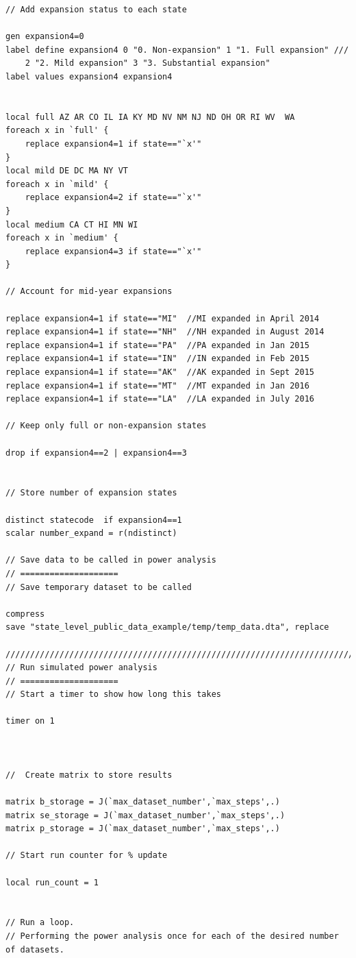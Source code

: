 \documentclass[12pt]{article}%
\begin{document}
\begin{appendices}
\begin{footnotesize}
\begin{verbatim}
// Add expansion status to each state

gen expansion4=0
label define expansion4 0 "0. Non-expansion" 1 "1. Full expansion" ///
    2 "2. Mild expansion" 3 "3. Substantial expansion" 
label values expansion4 expansion4


local full AZ AR CO IL IA KY MD NV NM NJ ND OH OR RI WV  WA
foreach x in `full' {
    replace expansion4=1 if state=="`x'"
}     
local mild DE DC MA NY VT
foreach x in `mild' {
    replace expansion4=2 if state=="`x'"
}
local medium CA CT HI MN WI
foreach x in `medium' {
    replace expansion4=3 if state=="`x'"
}

// Account for mid-year expansions

replace expansion4=1 if state=="MI"  //MI expanded in April 2014
replace expansion4=1 if state=="NH"  //NH expanded in August 2014
replace expansion4=1 if state=="PA"  //PA expanded in Jan 2015
replace expansion4=1 if state=="IN"  //IN expanded in Feb 2015
replace expansion4=1 if state=="AK"  //AK expanded in Sept 2015
replace expansion4=1 if state=="MT"  //MT expanded in Jan 2016
replace expansion4=1 if state=="LA"  //LA expanded in July 2016

// Keep only full or non-expansion states

drop if expansion4==2 | expansion4==3


// Store number of expansion states

distinct statecode  if expansion4==1 
scalar number_expand = r(ndistinct)  

// Save data to be called in power analysis
// ====================
// Save temporary dataset to be called 

compress
save "state_level_public_data_example/temp/temp_data.dta", replace

////////////////////////////////////////////////////////////////////////////////
// Run simulated power analysis
// ====================
// Start a timer to show how long this takes

timer on 1



//  Create matrix to store results

matrix b_storage = J(`max_dataset_number',`max_steps',.) 
matrix se_storage = J(`max_dataset_number',`max_steps',.) 
matrix p_storage = J(`max_dataset_number',`max_steps',.)

// Start run counter for % update

local run_count = 1


// Run a loop. 
// Performing the power analysis once for each of the desired number of datasets. 



\end{verbatim}
\end{footnotesize}
\end{appendices}
\end{document}
